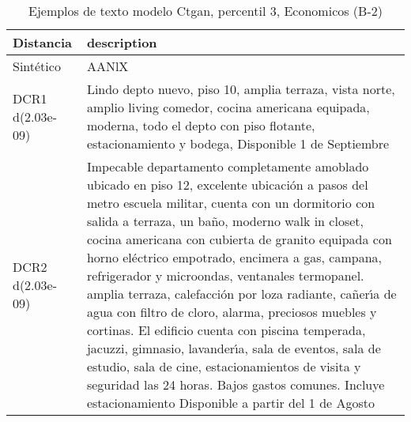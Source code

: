 \begin{table}[H]
\centering
\fontsize{10}{14}\selectfont
\caption{Ejemplos de texto modelo Ctgan, percentil 3, Economicos (B-2)}
\label{table-example-economicos-b-2-ctgan-3p-text}
\begin{tabular}{|l|m{35em}|}
\hline
\rowcolor[gray]{0.8}
Distancia & description \\
\hline Sintético & AANlX \\
\hline DCR1 d(2.03e-09) & Lindo depto nuevo, piso 10, amplia terraza, vista norte, amplio living comedor, cocina americana equipada, moderna, todo el depto con piso flotante, estacionamiento y bodega, Disponible 1 de Septiembre \\
\hline DCR2 d(2.03e-09) & Impecable departamento completamente amoblado ubicado en piso 12, excelente ubicaci\'on a pasos del metro escuela militar, cuenta con un dormitorio con salida a terraza, un ba\~no, moderno walk in closet, cocina americana con cubierta de granito equipada con horno el\'ectrico empotrado, encimera a gas, campana, refrigerador y microondas, ventanales termopanel. amplia terraza, calefacci\'on por loza radiante, ca\~ner{\'\i}a de agua con filtro de cloro, alarma, preciosos muebles y cortinas.
El edificio cuenta con piscina temperada, jacuzzi, gimnasio, lavander{\'\i}a, sala de eventos, sala de estudio, sala de cine, estacionamientos de visita y seguridad las 24 horas. Bajos gastos comunes.
Incluye estacionamiento
Disponible a partir del 1 de Agosto \\
\hline
\end{tabular}
\end{table}
